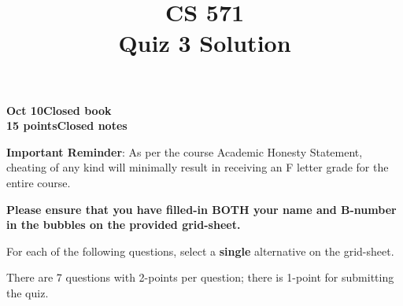 \documentclass[12pt]{article}
\title{CS 571\\Quiz 3 Solution}
\date{}
\begin{document}
\maketitle

\begin{flushleft}
\textbf{Oct 10}\hfill\textbf{Closed book}\\
\textbf{15 points}\hfill\textbf{Closed notes}\\

\vspace{0.5cm}

\textbf{Important Reminder}: As per the course Academic Honesty
Statement, cheating of any kind will minimally result in receiving an
F letter grade for the entire course.


\end{flushleft}

\textbf{Please ensure that you have filled-in BOTH your name and
  B-number in the bubbles on the provided grid-sheet.}

For each of the following questions, select a \textbf{single}
alternative on the grid-sheet.  

There are 7 questions with 2-points per question; there is 1-point
for submitting the quiz.
\end{document}
